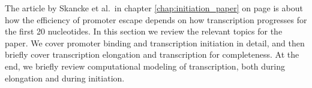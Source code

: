%
The article by Skancke et al.\ in chapter \ref{chap:initiation_paper} on page
\pageref{chap:initiation_paper} is about how the efficiency of promoter escape
depends on how transcription progresses for the first 20 nucleotides. In this
section we review the relevant topics for the paper. We cover promoter binding
and transcription initiation in detail, and then briefly cover transcription
elongation and transcription for completeness.  At the end, we briefly review
computational modeling of transcription, both during elongation and during
initiation.
